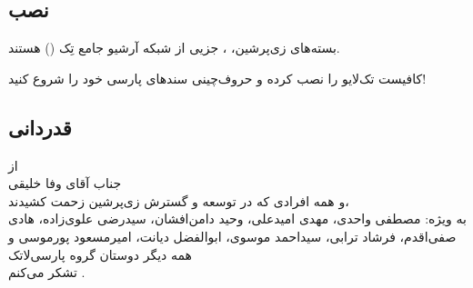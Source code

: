 


\subsection{نصب}
\begin{plainslide}%
{\small%
بسته‌های زی‌پرشین، ،  جزیی از شبکه آرشیو جامع تِک () هستند.}
\begin{center}
{\Huge%
کافیست تک‌لایو را نصب کرده و حروف‌چینی سندهای پارسی خود را شروع کنید!}
\end{center}
\end{plainslide}


\subsection{قدردانی}
\begin{plainslide}%
\begin{center}
{
 از \\
\Large
 جناب آقای وفا خلیقی\\
\large
  و همه افرادی که در توسعه و گسترش زی‌پرشین زحمت کشیدند،\\
به ویژه: مصطفی واحدی، مهدی امیدعلی، وحید دامن‌افشان،  سیدرضی علوی‌زاده، هادی صفی‌اقدم، فرشاد ترابی، سیداحمد موسوی، ابوالفضل دیانت، امیرمسعود پورموسی و  همه دیگر دوستان گروه پارسی‌لاتک\\
 تشکر می‌کنم
.}
\end{center}
\end{plainslide}